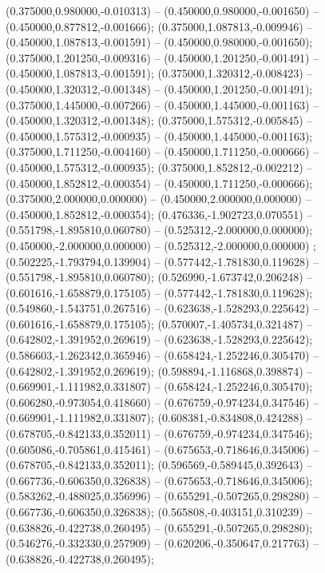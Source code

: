  (0.375000,0.980000,-0.010313) -- (0.450000,0.980000,-0.001650) -- (0.450000,0.877812,-0.001666);
 (0.375000,1.087813,-0.009946) -- (0.450000,1.087813,-0.001591) -- (0.450000,0.980000,-0.001650);
 (0.375000,1.201250,-0.009316) -- (0.450000,1.201250,-0.001491) -- (0.450000,1.087813,-0.001591);
 (0.375000,1.320312,-0.008423) -- (0.450000,1.320312,-0.001348) -- (0.450000,1.201250,-0.001491);
 (0.375000,1.445000,-0.007266) -- (0.450000,1.445000,-0.001163) -- (0.450000,1.320312,-0.001348);
 (0.375000,1.575312,-0.005845) -- (0.450000,1.575312,-0.000935) -- (0.450000,1.445000,-0.001163);
 (0.375000,1.711250,-0.004160) -- (0.450000,1.711250,-0.000666) -- (0.450000,1.575312,-0.000935);
 (0.375000,1.852812,-0.002212) -- (0.450000,1.852812,-0.000354) -- (0.450000,1.711250,-0.000666);
 (0.375000,2.000000,0.000000) -- (0.450000,2.000000,0.000000) -- (0.450000,1.852812,-0.000354);
 (0.476336,-1.902723,0.070551) -- (0.551798,-1.895810,0.060780) -- (0.525312,-2.000000,0.000000);
 (0.450000,-2.000000,0.000000) -- (0.525312,-2.000000,0.000000) ;
 (0.502225,-1.793794,0.139904) -- (0.577442,-1.781830,0.119628) -- (0.551798,-1.895810,0.060780);
 (0.526990,-1.673742,0.206248) -- (0.601616,-1.658879,0.175105) -- (0.577442,-1.781830,0.119628);
 (0.549860,-1.543751,0.267516) -- (0.623638,-1.528293,0.225642) -- (0.601616,-1.658879,0.175105);
 (0.570007,-1.405734,0.321487) -- (0.642802,-1.391952,0.269619) -- (0.623638,-1.528293,0.225642);
 (0.586603,-1.262342,0.365946) -- (0.658424,-1.252246,0.305470) -- (0.642802,-1.391952,0.269619);
 (0.598894,-1.116868,0.398874) -- (0.669901,-1.111982,0.331807) -- (0.658424,-1.252246,0.305470);
 (0.606280,-0.973054,0.418660) -- (0.676759,-0.974234,0.347546) -- (0.669901,-1.111982,0.331807);
 (0.608381,-0.834808,0.424288) -- (0.678705,-0.842133,0.352011) -- (0.676759,-0.974234,0.347546);
 (0.605086,-0.705861,0.415461) -- (0.675653,-0.718646,0.345006) -- (0.678705,-0.842133,0.352011);
 (0.596569,-0.589445,0.392643) -- (0.667736,-0.606350,0.326838) -- (0.675653,-0.718646,0.345006);
 (0.583262,-0.488025,0.356996) -- (0.655291,-0.507265,0.298280) -- (0.667736,-0.606350,0.326838);
 (0.565808,-0.403151,0.310239) -- (0.638826,-0.422738,0.260495) -- (0.655291,-0.507265,0.298280);
 (0.546276,-0.332330,0.257909) -- (0.620206,-0.350647,0.217763) -- (0.638826,-0.422738,0.260495);
